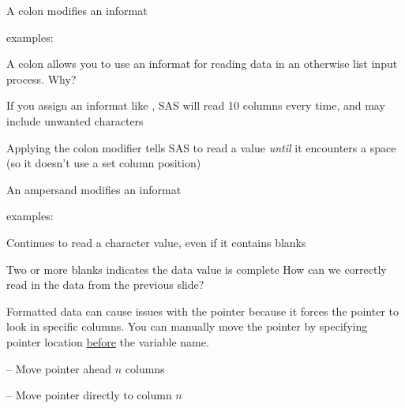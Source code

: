 \begin{frame}
\bi
\item A colon modifies an informat
\item examples:          
\item A colon allows you to use an informat for reading data in an otherwise list input process.  Why?
\bi
\item If you assign an informat like , SAS will read 10 columns every time, and may include unwanted characters
\ei
\item Applying the colon modifier tells SAS to read a value \emph{until} it encounters a space (so it doesn't use a set column position)
\ei
\end{frame}

\begin{frame}
\bi
\item An ampersand modifies an informat
\item examples:          
\item Continues to read a character value, even if it contains blanks
\item Two or more blanks indicates the data value is complete
\ei
\vskip10pt
\oyo How can we correctly read in the  data from the previous slide?
\end{frame}


\begin{frame}
Formatted data can cause issues with the pointer because it forces the pointer to look in specific columns.  You can manually move the pointer by specifying pointer location \underline{before} the variable name.
\bi
\item[]
\item {} -- Move pointer ahead $n$ columns
\item {} -- Move pointer directly to column $n$
\ei
\end{frame}

